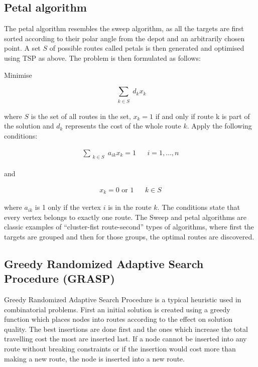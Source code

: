 \subsection{Petal algorithm}

The petal algorithm resembles the sweep algorithm, as all the targets are first sorted according to their polar angle from the depot and an arbitrarily chosen point. A set $S$ of possible routes called petals is then generated and optimised using TSP as above. The problem is then formulated as follows:

\bigskip
\noindent
Minimise

\begin{equation}
\label{eq:petal1}
\displaystyle\sum_{\substack{k \in S}} d_kx_k
\end{equation}


\noindent
where $S$ is the set of all routes in the set, $x_k = 1$ if and only if route k is part of the solution and $d_k$ represents the cost of the whole route $k$. Apply the following conditions:

\begin{equation}
\begin{aligned}
\label{eq:petal2}
\displaystyle\sum_{\substack{k \in S}} a_{ik}x_k = 1 && i = 1, \ldots, n
\end{aligned}
\end{equation}

\noindent
and

\begin{equation}
\begin{aligned}
\label{eq:petal3}
x_{k} = 0 \text{ or } 1 && k \in S
\end{aligned}
\end{equation}

where $a_{ik}$ is 1 only if the vertex $i$ is in the route $k$. \cite{laporte2000classical} The conditions state that every vertex belongs to exactly one route. The Sweep and petal algorithms are classic examples of ``cluster-fist route-second'' types of algorithms, where first the targets are grouped and then for those groups, the optimal routes are discovered. 


\subsection{Greedy Randomized Adaptive Search Procedure (GRASP)}

Greedy Randomized Adaptive Search Procedure is a typical heuristic used in combinatorial problems. First an initial solution is created using a greedy function which places nodes into routes according to the effect on solution quality. The best insertions are done first and the ones which increase the total travelling cost the most are inserted last. If a node cannot be inserted into any route without breaking constraints or if the insertion would cost more than making a new route, the node is inserted into a new route. \cite{kontoravdis1995grasp}

